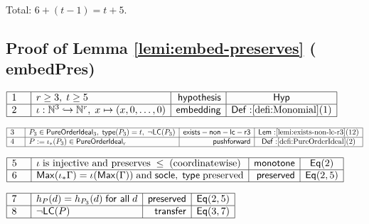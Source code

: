 \documentclass[11pt,reqno]{amsart}
\providecommand{\N}{\mathbb{N}}
\begin{document}
Total: $6+(t-1)=t+5$.

\medskip


\subsection*{Proof of Lemma \protect\ref{lemi:embed-preserves} (\textsf{%
embedPres})}

\noindent$%
\begin{array}{|m{0.5cm}|l|r|c|}
\hline
1 & r\ge3,\;t\ge5 & \mathsf{hypothesis} & \mathsf{Hyp} \\ \hline
2 & \iota:\N^{3}\hookrightarrow\N^{r},\;x\mapsto(x,0,\dots,0) & \mathsf{%
embedding} & \mathsf{Def:}\ref{defi:Monomial}(1) \\ \hline
\end{array}%
$

\nointerlineskip\noindent$%
\begin{array}{|m{0.5cm}|l|r|c|}
\hline
3 & P_{3}\in\mathsf{PureOrderIdeal}_{3},\;\mathsf{type}(P_{3})=t,\;\neg%
\mathsf{LC}(P_{3}) & \mathsf{exists-non-lc-r3} & \mathsf{Lem:}\ref%
{lemi:exists-non-lc-r3}(12) \\ \hline
4 & P:=\iota_{*}(P_{3})\in\mathsf{PureOrderIdeal}_{r} & \mathsf{pushforward}
& \mathsf{Def:}\ref{defi:PureOrderIdeal}(2) \\ \hline
\end{array}%
$

\nointerlineskip\noindent$%
\begin{array}{|m{0.5cm}|l|r|c|}
\hline
5 & \iota\;\text{is injective and preserves}\;\le\;(\text{coordinatewise}) & 
\mathsf{monotone} & \mathsf{Eq}(2) \\ \hline
6 & \mathsf{Max}(\iota_{*}\Gamma)=\iota(\mathsf{Max}(\Gamma))\;\text{and}\;%
\mathsf{socle},\;\mathsf{type}\;\text{preserved} & \mathsf{preserved} & 
\mathsf{Eq}(2,5) \\ \hline
\end{array}%
$

\nointerlineskip\noindent$%
\begin{array}{|m{0.5cm}|l|r|c|}
\hline
7 & h_{P}(d)=h_{P_{3}}(d)\;\mathsf{for\ all}\;d & \mathsf{preserved} & 
\mathsf{Eq}(2,5) \\ \hline
8 & \neg\mathsf{LC}(P) & \mathsf{transfer} & \mathsf{Eq}(3,7) \\ \hline
\end{array}%
$
\end{document}
